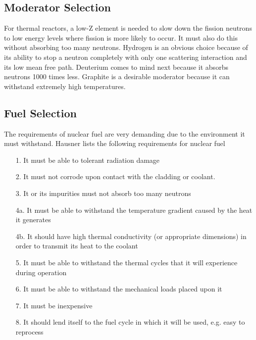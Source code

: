 

\subsection{Moderator Selection}
For thermal reactors, a low-Z element is needed to slow down the fission neutrons to low energy levels where fission is more likely to occur. It must also do this without absorbing too many neutrons. Hydrogen is an obvious choice because of its ability to stop a neutron completely with only one scattering interaction and its low mean free path. Deuterium comes to mind next because it absorbs neutrons 1000 times less. Graphite is a desirable moderator because it can withstand extremely high temperatures.


\subsection{Fuel Selection}
The requirements of nuclear fuel are very demanding due to the environment it must withstand. Hausner %
lists the following requirements for nuclear fuel
\begin{itemize}
\item[1.] It must be able to tolerant radiation damage
\item[2.] It must not corrode upon contact with the cladding or coolant.
\item[3.] It or its impurities must not absorb too many neutrons
\item[4a.] It must be able to withstand the temperature gradient caused by the heat it generates
\item[4b.] It should have high thermal conductivity (or appropriate dimensions) in order to transmit its heat to the coolant
\item[5.] It must be able to withstand the thermal cycles that it will experience during operation
\item[6.] It must be able to withstand the mechanical loads placed upon it
\item[7.] It must be inexpensive
\item[8.] It should lend itself to the fuel cycle in which it will be used, e.g. easy to reprocess
\end{itemize} 

